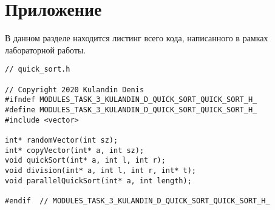 \documentclass{report}
\begin{document}
\section*{Приложение}
В данном разделе находится листинг всего кода, написанного в рамках лабораторной работы.
\begin{lstlisting}
// quick_sort.h

// Copyright 2020 Kulandin Denis
#ifndef MODULES_TASK_3_KULANDIN_D_QUICK_SORT_QUICK_SORT_H_
#define MODULES_TASK_3_KULANDIN_D_QUICK_SORT_QUICK_SORT_H_
#include <vector>

int* randomVector(int sz);
int* copyVector(int* a, int sz);
void quickSort(int* a, int l, int r);
void division(int* a, int l, int r, int* t);
void parallelQuickSort(int* a, int length);

#endif  // MODULES_TASK_3_KULANDIN_D_QUICK_SORT_QUICK_SORT_H_
\end{lstlisting}
\end{document}
